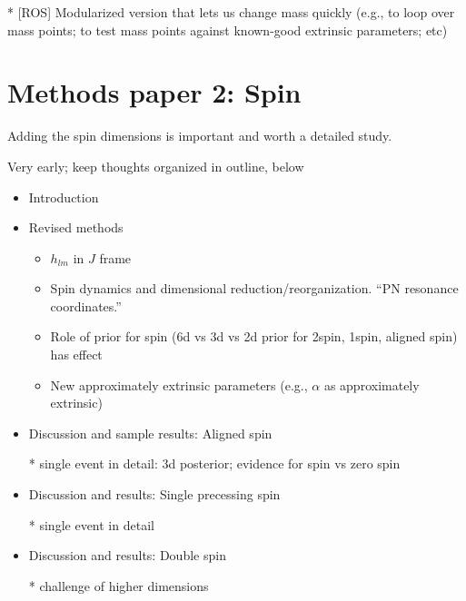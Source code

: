 * [ROS] Modularized version that lets us change mass quickly (e.g., to loop over mass points; to test mass points
against known-good extrinsic parameters; etc)

\section{Methods  paper 2: Spin}

Adding the spin dimensions is important and worth a detailed study.


Very early; keep thoughts organized in outline, below


\begin{itemize}

  \item Introduction
  \item Revised methods
    \begin{itemize}
        \item  $h_{lm}$ in $J$ frame
        \item Spin dynamics and dimensional reduction/reorganization.  ``PN resonance coordinates.''
        \item Role of prior for spin (6d vs 3d vs 2d prior for 2spin, 1spin, aligned spin) has effect
        \item New approximately extrinsic parameters (e.g., $\alpha$ as approximately extrinsic)
    \end{itemize}

 \item Discussion and sample results: Aligned spin
     
   * single event in detail: 3d posterior; evidence for spin vs zero spin

 \item Discussion and results: Single precessing spin



   * single event in detail

 \item Discussion and results: Double spin

  * challenge of higher dimensions
\end{itemize}
